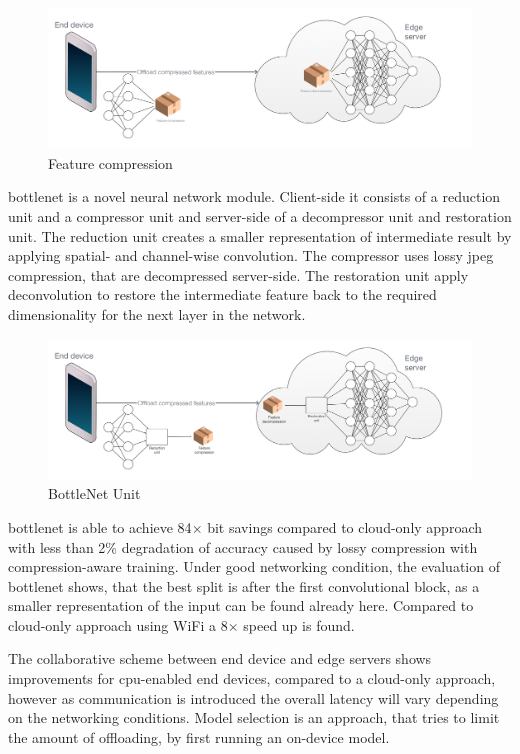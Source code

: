 \begin{figure}
	\centering
	\includegraphics[width=\linewidth]{figures/models/compressed}
	\caption[Feature compression]{Feature compression}
\end{figure}

\gls{bottlenet} \cite{eshratifar_bottlenet:_2019} is a novel neural network module. Client-side it consists of a reduction unit and a compressor unit and server-side of a decompressor unit and restoration unit. The reduction unit creates a smaller representation of intermediate result by applying spatial- and channel-wise convolution. The compressor uses lossy \gls{jpeg} compression, that are decompressed server-side. The restoration unit apply deconvolution to restore the intermediate feature back to the required dimensionality for the next layer in the network.

\begin{figure}
	\centering
	\includegraphics[width=\linewidth]{figures/models/bottlenet}
	\caption[BottleNet Unit]{BottleNet Unit}
\end{figure}

\gls{bottlenet} is able to achieve 84$\times$ bit savings compared to cloud-only approach with less than 2\% degradation of accuracy caused by lossy compression with compression-aware training. Under good networking condition, the evaluation of \gls{bottlenet} shows, that the best split is after the first convolutional block, as a smaller representation of the input can be found already here. Compared to cloud-only approach using WiFi a 8$\times$ speed up is found.

The collaborative scheme between end device and edge servers shows improvements for \gls{cpu}-enabled end devices, compared to a cloud-only approach, however as communication is introduced the overall latency will vary depending on the networking conditions. Model selection is an approach, that tries to limit the amount of offloading, by first running an on-device model. 

